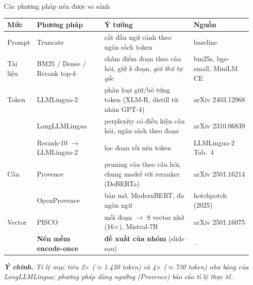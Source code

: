 \documentclass[aspectratio=169,11pt]{beamer}
\newcommand{\takeaway}[1]{{\footnotesize\itshape\color{hustdark}\textbf{Ý chính.} #1\par}}
\begin{document}
\begin{frame}{Các phương pháp nén được so sánh}
  \begingroup\scriptsize
  \renewcommand{\arraystretch}{1.15}
  \begin{tabularx}{\textwidth}{@{}l l >{\raggedright\arraybackslash}X l@{}}
  \toprule
  \textbf{\color{hustred}Mức} & \textbf{\color{hustred}Phương pháp} &
  \textbf{\color{hustred}Ý tưởng} & \textbf{\color{hustred}Nguồn} \\
  \midrule
  Prompt   & Truncate        & cắt đầu ngữ cảnh theo ngân sách token & baseline \\
  Tài liệu & BM25 / Dense / Rerank top-$k$ & chấm điểm đoạn theo câu hỏi, giữ $k$ đoạn, \emph{giữ thứ tự gốc} & bm25s, bge-small, MiniLM CE \\
  Token    & LLMLingua-2     & phân loại giữ/bỏ từng token (XLM-R, distill từ nhãn GPT-4) & arXiv 2403.12968 \\
           & LongLLMLingua   & perplexity có điều kiện câu hỏi, ngân sách theo đoạn & arXiv 2310.06839 \\
           & Rerank-10 $\to$ LLMLingua-2 & lọc đoạn rồi nén token & LLMLingua-2 Tab.~4 \\
  Câu      & Provence        & pruning câu theo câu hỏi, chung model với reranker (DeBERTa) & arXiv 2501.16214 \\
           & OpenProvence    & bản mở, ModernBERT, đa ngôn ngữ & hotchpotch (2025) \\
  \midrule
  Vector   & PISCO           & mỗi đoạn $\to$ 8 vector nhớ (16$\times$), Mistral-7B & arXiv 2501.16075 \\
           & \textbf{Nén mềm encode-once} & \textbf{đề xuất của nhóm} (slide sau) & -- \\
  \bottomrule
  \end{tabularx}\endgroup
  \vfill
  \takeaway{Tỉ lệ mục tiêu 2$\times$ ($\approx$1.450 token) và 4$\times$ ($\approx$730 token) như
  bảng của LongLLMLingua; phương pháp dùng ngưỡng (Provence) báo cáo tỉ lệ thực tế.}
\end{frame}
\end{document}
